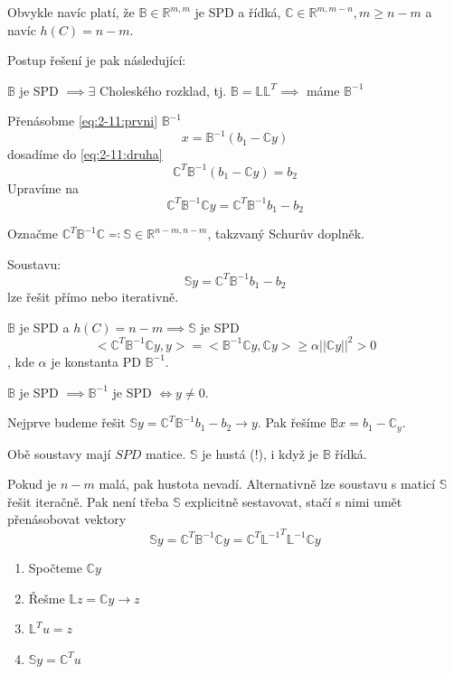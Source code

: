 \documentclass[../main.tex]{subfiles}
\begin{document}
Obvykle navíc platí, že $\mathbb{B}\in \mathbb{R}^{m,m}$ je SPD a řídká, $\mathbb{C}\in\mathbb{R}^{m,m-n}, m\geq n-m$ a navíc $h(C) = n-m$.


Postup řešení je pak následující:

$\mathbb{B}$ je SPD $\implies\exists$ Choleského rozklad, tj. $\mathbb{B} = \mathbb{L}\mathbb{L}^T \implies$ máme $\mathbb{B}^{-1}$

Přenásobme \eqref{eq:2-11:prvni} $\mathbb{B}^{-1}$
\begin{equation*}
    x = \mathbb{B}^{-1} (b_1 - \mathbb{C}y)
\end{equation*}
dosadíme do \eqref{eq:2-11:druha}
\begin{equation*}
    \mathbb{C}^T \mathbb{B}^{-1} (b_1 - \mathbb{C}y) = b_2
\end{equation*}
Upravíme na 
\begin{equation*}
    \mathbb{C}^T \mathbb{B}^{-1} \mathbb{C} y = \mathbb{C}^T \mathbb{B}^{-1} b_1 - b_2 
\end{equation*}

Označme $\mathbb{C}^T \mathbb{B}^{-1} \mathbb{C} \eqcolon \mathbb{S} \in \mathbb{R}^{n-m, n-m}$, takzvaný Schurův doplněk.


Soustavu:
\begin{equation*}
    \mathbb{S} y = \mathbb{C}^T \mathbb{B}^{-1} b_1 - b_2 
\end{equation*}
lze řešit přímo nebo iterativně.


$\mathbb{B}$ je SPD a $h(C) = n-m \implies \mathbb{S}$ je SPD
\begin{equation*}
    <\mathbb{C}^T \mathbb{B}^{-1} \mathbb{C} y ,y> = <\mathbb{B}^{-1} \mathbb{C}y, \mathbb{C}y> \geq \alpha ||\mathbb{C}y||^2 > 0
\end{equation*}
, kde $\alpha$ je konstanta PD $\mathbb{B}^{-1}$.

$\mathbb{B}$ je SPD $\implies \mathbb{B}^{-1}$ je SPD $\Leftrightarrow y\neq 0$.


Nejprve budeme řešit $\mathbb{S} y = \mathbb{C}^T\mathbb{B}^{-1} b_1 - b_2 \rightarrow y $.
Pak řešíme $\mathbb{B} x = b_1 - \mathbb{C}_y$.

Obě soustavy mají $SPD$ matice. $\mathbb{S}$ je hustá (!), i když je $\mathbb{B}$ řídká.

Pokud je $n-m$ malá, pak hustota nevadí. Alternativně lze soustavu s maticí $\mathbb{S}$ řešit iteračně.
Pak není třeba $\mathbb{S}$ explicitně sestavovat, stačí s nimi umět přenásobovat vektory
\begin{equation*}
    \mathbb{S}y = \mathbb{C}^T\mathbb{B}^{-1}\mathbb{C} y = \mathbb{C}^T{\mathbb{L}^{-1}}^T \mathbb{L}^{-1} \mathbb{C} y
\end{equation*}

\begin{enumerate}
    \item Spočteme $\mathbb{C}y$
    \item Řešme $\mathbb{L} z = \mathbb{C}y \rightarrow z$
    \item $\mathbb{L}^T u = z$
    \item $\mathbb{S} y = \mathbb{C}^T u$ 
\end{enumerate}
\end{document}
